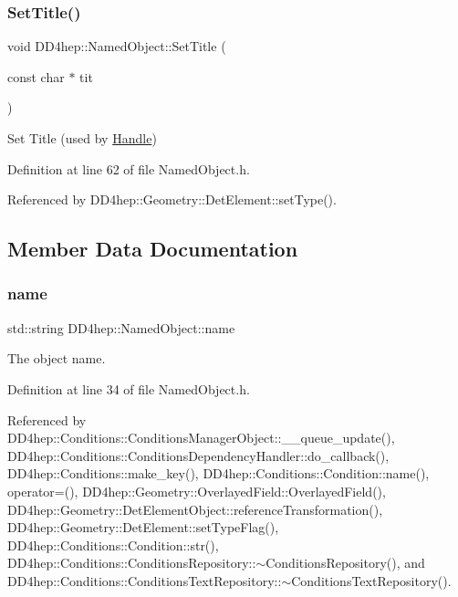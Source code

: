 \hypertarget{class_d_d4hep_1_1_named_object_ac0ca31db35ec2162134e5a9b92e8a0d6}{}\label{class_d_d4hep_1_1_named_object_ac0ca31db35ec2162134e5a9b92e8a0d6} 
\subsubsection{\texorpdfstring{Set\+Title()}{SetTitle()}}
{\footnotesize\ttfamily void D\+D4hep\+::\+Named\+Object\+::\+Set\+Title (\begin{DoxyParamCaption}\item[{const char $\ast$}]{tit }\end{DoxyParamCaption})\hspace{0.3cm}{\ttfamily [inline]}}



Set Title (used by \hyperlink{class_d_d4hep_1_1_handle}{Handle}) 



Definition at line 62 of file Named\+Object.\+h.



Referenced by D\+D4hep\+::\+Geometry\+::\+Det\+Element\+::set\+Type().



\subsection{Member Data Documentation}
\hypertarget{class_d_d4hep_1_1_named_object_a4675ccdc57835ec27eef8f2799eb77a2}{}\label{class_d_d4hep_1_1_named_object_a4675ccdc57835ec27eef8f2799eb77a2} 
\subsubsection{\texorpdfstring{name}{name}}
{\footnotesize\ttfamily std\+::string D\+D4hep\+::\+Named\+Object\+::name}



The object name. 



Definition at line 34 of file Named\+Object.\+h.



Referenced by D\+D4hep\+::\+Conditions\+::\+Conditions\+Manager\+Object\+::\+\_\+\+\_\+queue\+\_\+update(), D\+D4hep\+::\+Conditions\+::\+Conditions\+Dependency\+Handler\+::do\+\_\+callback(), D\+D4hep\+::\+Conditions\+::make\+\_\+key(), D\+D4hep\+::\+Conditions\+::\+Condition\+::name(), operator=(), D\+D4hep\+::\+Geometry\+::\+Overlayed\+Field\+::\+Overlayed\+Field(), D\+D4hep\+::\+Geometry\+::\+Det\+Element\+Object\+::reference\+Transformation(), D\+D4hep\+::\+Geometry\+::\+Det\+Element\+::set\+Type\+Flag(), D\+D4hep\+::\+Conditions\+::\+Condition\+::str(), D\+D4hep\+::\+Conditions\+::\+Conditions\+Repository\+::$\sim$\+Conditions\+Repository(), and D\+D4hep\+::\+Conditions\+::\+Conditions\+Text\+Repository\+::$\sim$\+Conditions\+Text\+Repository().

